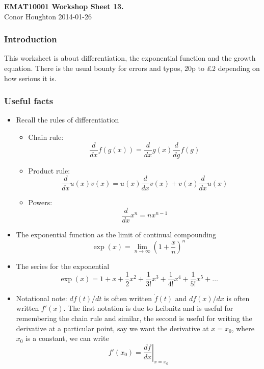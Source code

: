 \documentclass[12pt]{article}
\begin{document}
\begin{center}
{\bf EMAT10001 Workshop Sheet 13.}\\[1cm]{} Conor Houghton 2014-01-26
\end{center}
\subsubsection*{Introduction} 
This worksheet is about differentiation, the exponential function and
the growth equation. There is the usual bounty for errors and typos, 20p to \pounds 2
depending on how serious it is.

\subsubsection*{Useful facts}
\begin{itemize}
\item Recall the rules of differentiation
\begin{itemize}
\item Chain rule: 
\begin{equation}
\frac{d}{dx}f(g(x))=\frac{d}{dx}g(x)\frac{d}{dg}f(g)
\end{equation}
\item Product rule:
\begin{equation}
\frac{d}{dx}u(x)v(x)=u(x)\frac{d}{dx}v(x)+v(x)\frac{d}{dx}u(x)
\end{equation}
\item Powers:
\begin{equation}
\frac{d}{dx}x^n=nx^{n-1}
\end{equation}
\end{itemize}
\item The exponential function as the limit of continual compounding
\begin{equation}
\exp(x)=\lim_{n\rightarrow \infty}\left(1+\frac{x}{n}\right)^n
\end{equation}
\item The series for the exponential
\begin{equation}
\exp(x)=1+x+\frac{1}{2}x^2+\frac{1}{3!}x^3+\frac{1}{4!}x^4+\frac{1}{5!}x^5+\ldots
\end{equation}
\item Notational note: $df(t)/dt$ is often written $\dot{f}(t)$ and $df(x)/dx$ is often written $f'(x)$. The first notation is due to Leibnitz and is useful for remembering the chain rule and similar, the second is useful for writing the derivative at a particular point, say we want the derivative at $x=x_0$, where $x_0$ is a constant, we can write
\begin{equation}
f'(x_0)=\left.\frac{df}{dx}\right|_{x=x_0}
\end{equation}

\end{itemize}
\end{document}
